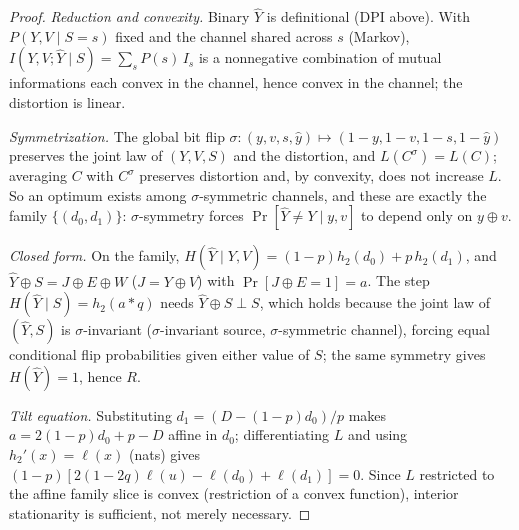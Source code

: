 \documentclass[11pt]{article}
\begin{document}
\begin{proof}
\emph{Reduction and convexity.} Binary $\hat Y$ is definitional (DPI
above). With $P(Y,V\mid S=s)$ fixed and the channel shared across $s$
(Markov), $I(Y,V;\hat Y\mid S)=\sum_sP(s)\,I_s$ is a nonnegative
combination of mutual informations each convex in the channel, hence
convex in the channel; the distortion is linear.

\emph{Symmetrization.} The global bit flip
$\sigma:(y,v,s,\hat y)\mapsto(1{-}y,1{-}v,1{-}s,1{-}\hat y)$ preserves
the joint law of $(Y,V,S)$ and the distortion, and $L(C^\sigma)=L(C)$;
averaging $C$ with $C^\sigma$ preserves distortion and, by convexity,
does not increase $L$. So an optimum exists among $\sigma$-symmetric
channels, and these are exactly the family $\{(d_0,d_1)\}$:
$\sigma$-symmetry forces $\Pr[\hat Y\ne Y\mid y,v]$ to depend only on
$y\oplus v$.

\emph{Closed form.} On the family, $H(\hat Y\mid Y,V)=
(1-p)h_2(d_0)+p\,h_2(d_1)$, and $\hat Y\oplus S=J\oplus E\oplus W$
($J=Y\oplus V$) with $\Pr[J\oplus E=1]=a$. The step
$H(\hat Y\mid S)=h_2(a*q)$ needs $\hat Y\oplus S\perp S$, which holds
because the joint law of $(\hat Y,S)$ is $\sigma$-invariant
($\sigma$-invariant source, $\sigma$-symmetric channel), forcing equal
conditional flip probabilities given either value of $S$; the same
symmetry gives $H(\hat Y)=1$, hence $R$.

\emph{Tilt equation.} Substituting $d_1=(D-(1-p)d_0)/p$ makes
$a=2(1-p)d_0+p-D$ affine in $d_0$; differentiating $L$ and using
$h_2'(x)=\ell(x)$ (nats) gives
$(1-p)[2(1-2q)\ell(u)-\ell(d_0)+\ell(d_1)]=0$. Since $L$ restricted to
the affine family slice is convex (restriction of a convex function),
interior stationarity is sufficient, not merely necessary.


\end{proof}
\end{document}

